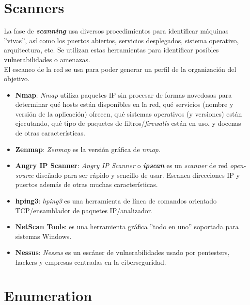 \documentclass[bibliography=totocnumbered]{scrartcl}
\begin{document}
\newpage
\section{Scanners}
La fase de \textbf{\textit{scanning}} usa diversos procedimientos para identificar máquinas ''vivas'', así como los puertos abiertos, servicios desplegados, sistema operativo, arquitectura, etc. Se utilizan estas herramientas para identificar posibles vulnerabilidades o amenazas.\\
El escaneo de la red se usa para poder generar un perfil de la organización del objetivo.
\begin{itemize}
\item \textbf{Nmap}\parencite{nmap}: \textit{Nmap} utiliza paquetes IP sin procesar de formas novedosas para determinar qué hosts están disponibles en la red, qué servicios (nombre y versión de la aplicación) ofrecen, qué sistemas operativos (y versiones) están ejecutando, qué tipo de paquetes de filtros/\textit{firewalls} están en uso, y docenas de otras características. 
\item \textbf{Zenmap}\parencite{zenmap}: \textit{Zenmap} es la versión gráfica de \textit{nmap}\parencite{nmap}.
\item \textbf{Angry IP Scanner}\parencite{angry}: \textit{Angry IP Scanner} o \textit{\textbf{ipscan}} es un \textit{scanner} de red \textit{open-source} diseñado para ser rápido y sencillo de usar. Escanea direcciones IP y puertos además de otras muchas características.
\item \textbf{hping3}\parencite{hping3}: \textit{hping3} es una herramienta de línea de comandos orientado TCP/ensamblador de paquetes IP/analizador.
\item \textbf{NetScan Tools}\parencite{netscan}: es una herramienta gráfica ''todo en uno'' soportada para sistemas Windows.
\item \textbf{Nessus}\parencite{nessus}: \textit{Nessus} es un escáner de vulnerabilidades usado por pentesters, hackers y empresas centradas en la ciberseguridad.
\end{itemize}

\newpage
\section{Enumeration}

\newpage
\nocite{*}
\printbibliography 
\end{document}
